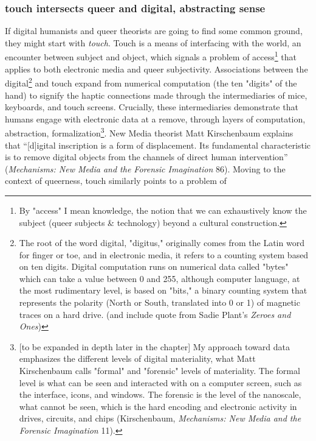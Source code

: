 \documentclass[11pt]{article}
\begin{document}
\subsubsection{touch intersects queer and digital, abstracting sense}
\label{sec:orga5804b1}

If digital humanists and queer theorists are going to find some common
ground, they might start with \emph{touch}. Touch is a means of interfacing
with the world, an encounter between subject and object, which signals
a problem of access\footnote{By "access" I mean knowledge, the notion that we can
exhaustively know the subject (queer subjects \& technology) beyond a
cultural construction.} that applies to both electronic media and
queer subjectivity. Associations between the digital\footnote{The root of the word digital, "digitus," originally comes from
the Latin word for finger or toe, and in electronic media, it refers
to a counting system based on ten digits. Digital computation runs on
numerical data called "bytes" which can take a value between 0 and
255, although computer language, at the most rudimentary level, is
based on "bits," a binary counting system that represents the polarity
(North or South, translated into 0 or 1) of magnetic traces on a hard
drive. (and include quote from Sadie Plant's \emph{Zeroes and Ones})\label{org51966a4}} and touch
expand from numerical computation (the ten "digits" of the hand) to
signify the haptic connections made through the intermediaries of
mice, keyboards, and touch screens. Crucially, these intermediaries
demonstrate that humans engage with electronic data at a remove,
through layers of computation, abstraction, formalization\footnote{[to be expanded in depth later in the chapter] My approach
toward data emphasizes the different levels of digital materiality,
what Matt Kirschenbaum calls "formal" and "forensic" levels of
materiality. The formal level is what can be seen and interacted with
on a computer screen, such as the interface, icons, and windows. The
forensic is the level of the nanoscale, what cannot be seen, which is
the hard encoding and electronic activity in drives, circuits, and
chips (Kirschenbaum, \emph{Mechanisms: New Media and the Forensic
Imagination} 11).}. New
Media theorist Matt Kirschenbaum explains that “[d]igital inscription
is a form of displacement. Its fundamental characteristic is to remove
digital objects from the channels of direct human intervention”
(\emph{Mechanisms: New Media and the Forensic Imagination} 86). Moving to
the context of queerness, touch similarly points to a problem of
\end{document}
